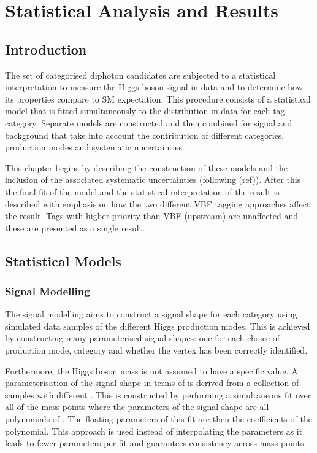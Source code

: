 
\chapter{Statistical Analysis and Results}
\label{chap:statistical}

\newpage

\section{Introduction}
The set of categorised diphoton candidates are subjected to a statistical interpretation to measure the Higgs boson signal in data and to determine how its properties compare to SM expectation.
This procedure consists of a statistical model that is fitted simultaneously to the \mgg distribution in data for each tag category. 
Separate models are constructed and then combined for signal and background that take into account the contribution of different categories, production modes and systematic uncertainties.

This chapter begins by describing the construction of these models and the inclusion of the associated systematic uncertainties (following (ref)). 
After this the final fit of the model and the statistical interpretation of the result is described with emphasis on how the two different VBF tagging approaches affect the result. 
Tags with higher priority than VBF (upstream) are unaffected and these are presented as a single result. 


\section{Statistical Models}
\subsection{Signal Modelling}
The signal modelling aims to construct a signal shape for each category using simulated data samples of the different Higgs production modes.
This is achieved by constructing many parameterised signal shapes: one for each choice of production mode, category and whether the vertex has been correctly identified. 

Furthermore, the Higgs boson mass \mH is not assumed to have a specific value. A parameterisation of the signal shape in terms of \mH is derived from a collection of samples with different \mH.
This is constructed by performing a simultaneous fit over all of the mass points where the parameters of the signal shape are all polynomials of \mH. 
The floating parameters of this fit are then the coefficients of the polynomial. 
This approach is used instead of interpolating the parameters as it leads to fewer parameters per fit and guarantees consistency across mass points. 

